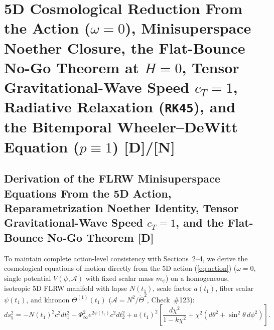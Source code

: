 \documentclass[11pt,a4paper]{article}
\newcommand{\catD}{\textbf{\textcolor{blue!75!black}{[D]}}}
\newcommand{\catN}{\textbf{\textcolor{teal!75!black}{[N]}}}
\theoremstyle{definition}
\theoremstyle{remark}
\begin{document}
\section{\texorpdfstring{5D Cosmological Reduction From the Action ($\omega = 0$), Minisuperspace Noether Closure, the Flat-Bounce No-Go Theorem at $H = 0$, Tensor Gravitational-Wave Speed $c_T = 1$, Radiative Relaxation (\texttt{RK45}), and the Bitemporal Wheeler--DeWitt Equation ($p \equiv 1$) \catD/\catN}{5D Cosmological Reduction From the Action, Minisuperspace Noether Closure, the Flat-Bounce No-Go Theorem, Tensor Gravitational-Wave Speed c_T = 1, Radiative Relaxation, and the Bitemporal Wheeler-DeWitt Equation}}

\subsection{\texorpdfstring{Derivation of the FLRW Minisuperspace Equations From the 5D Action, Reparametrization Noether Identity, Tensor Gravitational-Wave Speed $c_T = 1$, and the Flat-Bounce No-Go Theorem \catD}{Derivation of the FLRW Minisuperspace Equations From the 5D Action, Reparametrization Noether Identity, Tensor Gravitational-Wave Speed c_T = 1, and the Flat-Bounce No-Go Theorem}}

To maintain complete action-level consistency with Sections~2--4, we derive the cosmological equations of motion directly from the 5D action (\ref{eq:action}) ($\omega = 0$, single potential $V(\psi, \mathcal{A})$ with fixed scalar mass $m_{\psi}$) on a homogeneous, isotropic 5D FLRW manifold with lapse $N(t_1)$, scale factor $a(t_1)$, fiber scalar $\psi(t_1)$, and khronon $\Theta^{(1)}(t_1)$ ($\mathcal{A} = N^2/\dot{\Theta}^2$, Check~\#123):
\begin{equation}
  ds_5^2 = -N(t_1)^2 c^2 dt_1^2 - \Phi_{\infty}^2 e^{2\psi(t_1)} c^2 dt_2^2 + a(t_1)^2\left[\frac{d\chi^2}{1 - k\chi^2} + \chi^2\left(d\theta^2 + \sin^2\theta\,d\phi^2\right)\right].
  \label{eq:flrw_5d_metric}
\end{equation}
\end{document}
